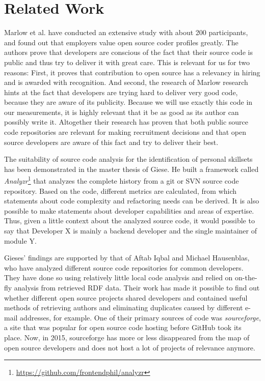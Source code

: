 \section{Related Work}

Marlow et al.\cite{md:2013} have conducted an extensive study with about 200 participants, and found out that employers value open source coder profiles greatly.
The authors prove that developers are conscious of the fact that their source code is public and thus try to deliver it with great care. This is relevant for us for two reasons: First, it proves that contribution to open source has a relevancy in hiring and is awarded with recognition. And second, the research of Marlow research hints at the fact that developers are trying hard to deliver very good code, because they are aware of its publicity. Because we will use exactly this code in our measurements, it is highly relevant that it be as good as its author can possibly write it. Altogether their research has proven that both public source code repositories are relevant for making recruitment decisions and that open source developers are aware of this fact and try to deliver their best.
\newline

The suitability of source code analysis for the identification of personal skillsets has been demonstrated in the master thesis of Giese\cite{pg:2014}. He built a framework called \textit{Analyzr}\footnote{\url{https://github.com/frontendphil/analyzr}} that analyzes the complete history from a git or SVN source code repository. Based on the code, different metrics are calculated, from which statements about code complexity and refactoring needs can be derived. It is also possible to make statements about developer capabilities and areas of expertise. Thus, given a little context about the analyzed source code, it would possible to say that \glqq Developer X is mainly a backend developer and the single maintainer of module Y\grqq.

Gieses' findings are supported by that of Aftab Iqbal and Michael Hausenblas, who have analyzed different source code repositories for common developers\cite{ih:2012}. They have done so using relatively little local code analysis and relied on on-the-fly analysis from retrieved RDF data. Their work has made it possible to find out whether different open source projects shared developers and contained useful methods of retrieving authors and eliminating duplicates caused by different e-mail addresses, for example. One of their primary sources of code was \textit{sourceforge}, a site that was popular for open source code hosting before GitHub took its place. Now, in 2015, sourceforge has more or less disappeared from the map of open source developers and does not host a lot of projects of relevance anymore.
\newline

